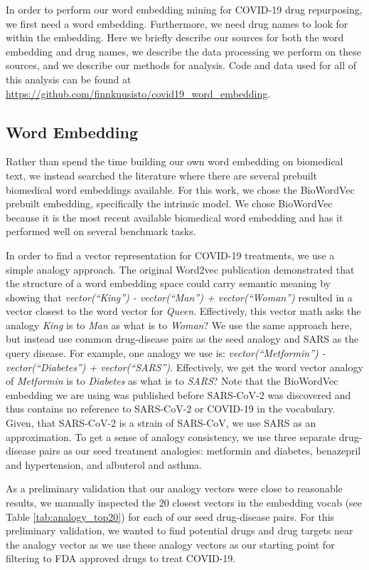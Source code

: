 \documentclass{article}
\begin{document}
In order to perform our word embedding mining for COVID-19 drug repurposing, we first need a word embedding.
Furthermore, we need drug names to look for within the embedding.
Here we briefly describe our sources for both the word embedding and drug names, we describe the data processing we perform on these sources, and we describe our methods for analysis.
Code and data used for all of this analysis can be found at \url{https://github.com/finnkuusisto/covid19_word_embedding}.

\subsection{Word Embedding}

Rather than spend the time building our own word embedding on biomedical text, we instead searched the literature where there are several prebuilt biomedical word embeddings available.
For this work, we chose the BioWordVec\cite{zhang2019biowordvec} prebuilt embedding, specifically the intrinsic model.
We chose BioWordVec because it is the most recent available biomedical word embedding and has it performed well on several benchmark tasks.

In order to find a vector representation for COVID-19 treatments, we use a simple analogy approach.
The original Word2vec publication demonstrated that the structure of a word embedding space could carry semantic meaning by showing that \emph{vector(``King'') - vector(``Man'') + vector(``Woman'')} resulted in a vector closest to the word vector for \emph{Queen}\cite{mikolov2013efficient}.
Effectively, this vector math asks the analogy \emph{King} is to \emph{Man} as what is to \emph{Woman}?
We use the same approach here, but instead use common drug-disease pairs as the seed analogy and SARS as the query disease.
For example, one analogy we use is: \emph{vector(``Metformin'') - vector(``Diabetes'') + vector(``SARS'')}.
Effectively, we get the word vector analogy of \emph{Metformin} is to \emph{Diabetes} as what is to \emph{SARS}?
Note that the BioWordVec embedding we are using was published before SARS-CoV-2 was discovered and thus contains no reference to SARS-CoV-2 or COVID-19 in the vocabulary.
Given, that SARS-CoV-2 is a strain of SARS-CoV\cite{of2020species}, we use SARS as an approximation.
To get a sense of analogy consistency, we use three separate drug-disease pairs as our seed treatment analogies: metformin and diabetes, benazepril and hypertension, and albuterol and asthma.

As a preliminary validation that our analogy vectors were close to reasonable results, we manually inspected the 20 closest vectors in the embedding vocab (see Table \ref{tab:analogy_top20}) for each of our seed drug-disease pairs.
For this preliminary validation, we wanted to find potential drugs and drug targets near the analogy vector as we use these analogy vectors as our starting point for filtering to FDA approved drugs to treat COVID-19.
\end{document}
